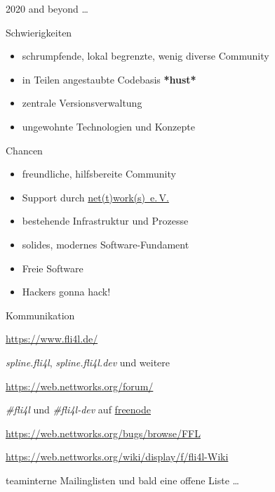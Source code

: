 \documentclass[t]{beamer}
\makeatletter
\newcommand{\strong}[1]{\@strong{#1}}
\newcommand{\@@strong}[1]{\textbf{\let\@strong\@@@strong#1}}
\newcommand{\@@@strong}[1]{\textnormal{\let\@strong\@@strong#1}}
\let\@strong\@@strong
\makeatother
\begin{document}
\begin{frame}{2020 and beyond …}
    \begin{alertblock}{Schwierigkeiten}
        \begin{itemize}
            \item schrumpfende, lokal begrenzte, wenig diverse Community
            \item in Teilen angestaubte Codebasis \strong{*hust*}
            \item zentrale Versionsverwaltung
            \item ungewohnte Technologien und Konzepte
        \end{itemize}
    \end{alertblock}
    \pause
    \begin{exampleblock}{Chancen}
        \begin{itemize}
            \item freundliche, hilfsbereite Community
            \item Support durch \href{https://www.nettworks.org/}{net(t)work(s)~e.\,V.}
            \item bestehende Infrastruktur und Prozesse
            \item solides, modernes Software-Fundament
            \item Freie Software
            \item Hackers gonna hack!
        \end{itemize}
    \end{exampleblock}
\end{frame}

\begin{frame}{Kommunikation}
    \begin{description}[Newsgroups]
        \item[WWW] \url{https://www.fli4l.de/}
        \item[Newsgroups] \emph{spline.fli4l}, \emph{spline.fli4l.dev}
            und weitere
        \item[Forum] \url{https://web.nettworks.org/forum/}
        \item[IRC] \emph{\#fli4l} und \emph{\#fli4l-dev} auf
            \href{https://freenode.net/}{freenode}
        \item[Bugtracker] \url{https://web.nettworks.org/bugs/browse/FFL}
        \item[Wiki] \small
            \url{https://web.nettworks.org/wiki/display/f/fli4l-Wiki}
            \normalsize
        \item[E-Mail] teaminterne Mailinglisten und bald eine offene Liste …
    \end{description}
\end{frame}
\end{document}
